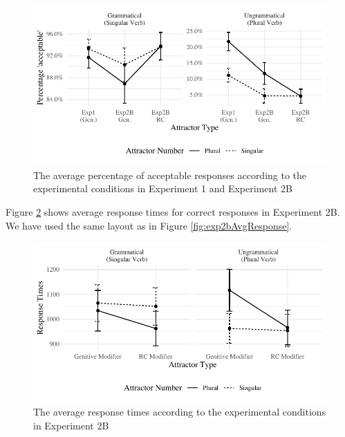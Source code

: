 \begin{knitrout}
\color{fgcolor}\begin{figure}[hbt!]

{\centering \includegraphics[width=\linewidth]{figure/exp2B1AvgResponse-1} 

}

\caption[The average percentage of acceptable responses according to the experimental conditions in Experiment 1 and Experiment 2B]{The average percentage of acceptable responses according to the experimental conditions in Experiment 1 and Experiment 2B}\label{fig:exp2B1AvgResponse}
\end{figure}

\end{knitrout}

Figure \ref{fig:exp2bRT} shows average response times for correct responses in Experiment 2B. We have used the same layout as in Figure \ref{fig:exp2bAvgResponse}.

\begin{knitrout}
\color{fgcolor}\begin{figure}[hbt!]

{\centering \includegraphics[width=\linewidth]{figure/exp2bRT-1} 

}

\caption[The average response times according to the experimental conditions in Experiment 2B]{The average response times according to the experimental conditions in Experiment 2B}\label{fig:exp2bRT}
\end{figure}

\end{knitrout}

